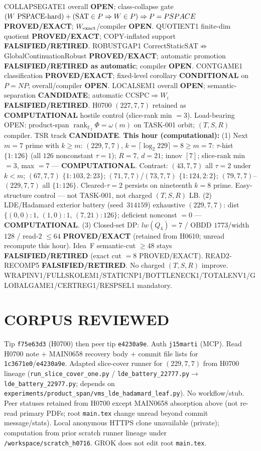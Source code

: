 \documentclass[11pt]{article}
\begin{document}
COLLAPSEGATE1 overall \textbf{OPEN}; class-collapse gate
$(W\text{ PSPACE-hard})+({\rm SAT}\in P\Rightarrow W\in P)\Rightarrow P=PSPACE$
\textbf{PROVED/EXACT}; $W_{\rm exact}$/compiler \textbf{OPEN}.
QUOTIENT1 finite-dim quotient \textbf{PROVED/EXACT}; COPY-inflated support \textbf{FALSIFIED/RETIRED}.
ROBUSTGAP1 CorrectStaticSAT$\not\Rightarrow$GlobalContinuationRobust \textbf{PROVED/EXACT};
automatic promotion \textbf{FALSIFIED/RETIRED as automatic}; compiler \textbf{OPEN}.
CONTGAME1 classification \textbf{PROVED/EXACT}; fixed-level corollary \textbf{CONDITIONAL} on $P=NP$;
overall/compiler \textbf{OPEN}.
LOCALSEM1 overall \textbf{OPEN}; semantic-separation \textbf{CANDIDATE}; automatic CCSPC$\Rightarrow W_i$
\textbf{FALSIFIED/RETIRED}.
H0700 $(227,7,7)$ retained as \textbf{COMPUTATIONAL} hostile control (slice-rank min $=3$).
Load-bearing OPEN: product-span $\operatorname{rank}_{\mathbb F_2}\Phi=\omega(m)$ on TASK-001 orbit;
$(T,S,R)$ compiler. TSR track \textbf{CANDIDATE}.
\textbf{This hour (computational):}
(1) Next $m{=}7$ prime with $k{\ge}m$: $(229,7,7)$, $k=\lceil\log_2 229\rceil=8{\ge}m{=}7$:
$\tau$-hist $\{1{:}126\}$ (all $126$ nonconstant $\tau{=}1$); $R{=}7$, $d{=}21$; innov $[7]$;
slice-rank min $=3$, max $=7$ --- \textbf{COMPUTATIONAL}.
Contrast: $(43,7,7)$ all $\tau{=}2$ under $k{<}m$; $(67,7,7)$ $\{1{:}103,2{:}23\}$;
$(71,7,7)$/$(73,7,7)$ $\{1{:}124,2{:}2\}$; $(79,7,7)$--$(229,7,7)$ all $\{1{:}126\}$.
Cleared-$\tau{=}2$ persists on nineteenth $k{=}8$ prime. Easy-structure control --- not TASK-001,
not charged $(T,S,R)$ LB.
(2) LDE/Hadamard exterior battery (seed~$314159$) exhaustive $(229,7,7)$:
dist $\{(0,0){:}1,\,(1,0){:}1,\,(7,21){:}126\}$; deficient nonconst $=0$ --- \textbf{COMPUTATIONAL}.
(3) Closed-set DP: $lw(Q_4)=7$ / OBDD $1773$/width $128$ / read-$2$ $\le64$
\textbf{PROVED/EXACT} (retained from H0610; unread recompute this hour).
Idea~F semantic-cut $\ge48$ stays \textbf{FALSIFIED/RETIRED} (exact cut $=8$ PROVED/EXACT).
READ2-RECOMP5 \textbf{FALSIFIED/RETIRED}. No charged $(T,S,R)$ improve.
WRAPINV1/FULLSKOLEM1/STATICNP1/BOTTLENECK1/TOTALENV1/GLOBALGAME1/CERTREG1/RESPSEL1 mandatory.

\section*{CORPUS REVIEWED}
Tip \texttt{f75e63d3} (H0700) then peer tip \texttt{e4230a9e}. Auth \texttt{j15marti} (MCP).
Read H0700 note + MAIN0658 recovery body + commit file lists for \texttt{1c3671e0}/\texttt{e4230a9e}.
Adapted slice-cover runner for $(229,7,7)$ from H0700 lineage
(\texttt{run\_slice\_cover\_one.py} / \texttt{lde\_battery\_22777.py}$\to$\texttt{lde\_battery\_22977.py};
depends on \texttt{experiments/product\_span/vms\_lde\_hadamard\_leaf.py}).
No workflow/stub. Peer statuses retained from H0700 except MAIN0658 absorption above
(not re-read primary PDFs; root \texttt{main.tex} change unread beyond commit message/stats).
Local anonymous HTTPS clone unavailable (private);
computation from prior scratch runner lineage under \texttt{/workspace/scratch\_h0716}.
GROK does not edit root \texttt{main.tex}.
\end{document}
